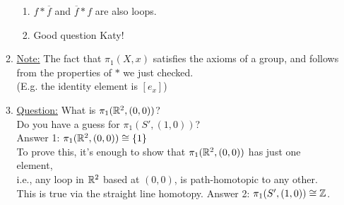 \begin{enumerate}
\begin{enumerate}
\begin{enumerate}
                        \item $f*\overline{f}$ and $\overline{f}*f$ are also loops.
                        \item Good question Katy!
                    \end{enumerate}
                \item \underline{Note:} The fact that $\pi_1(X,x)$ satisfies the axioms of a group, and follows from the
                    properties of $*$ we just checked.\\
                    (E.g. the identity element is $[e_x]$)\\
                \item \underline{Question:} What is $\pi_1(\mathbb{R}^2, (0,0))$?\\
                    Do you have a guess for $\pi_{1}(S', (1,0))$?\\
                    Answer 1: $\pi_1(\mathbb{R}^2, (0,0))\cong \{1\}$\\
                    To prove this, it's enough to show that $\pi_1(\mathbb{R}^2, (0,0))$ has just one element,\\
                    i.e., any loop in $\mathbb{R}^2$ based at $(0,0)$, is path-homotopic to any other. This is true
                    via the straight line homotopy.
                    Answer 2: $\pi_1(S', (1,0))\cong \mathbb{Z}$.\\
            \end{enumerate}
    \end{enumerate}
